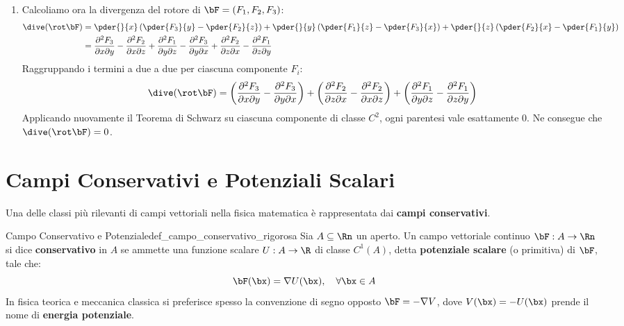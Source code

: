 \begin{dimostrazione}
\begin{enumerate}
    \item Calcoliamo ora la divergenza del rotore di $\bF = (F_1, F_2, F_3)$:
    \begin{align*}
    \dive(\rot \bF) &= \pder{}{x}\left( \pder{F_3}{y} - \pder{F_2}{z} \right) + \pder{}{y}\left( \pder{F_1}{z} - \pder{F_3}{x} \right) + \pder{}{z}\left( \pder{F_2}{x} - \pder{F_1}{y} \right) \\
    &= \frac{\partial^2 F_3}{\partial x \partial y} - \frac{\partial^2 F_2}{\partial x \partial z} + \frac{\partial^2 F_1}{\partial y \partial z} - \frac{\partial^2 F_3}{\partial y \partial x} + \frac{\partial^2 F_2}{\partial z \partial x} - \frac{\partial^2 F_1}{\partial z \partial y}
    \end{align*}
    Raggruppando i termini a due a due per ciascuna componente $F_i$:
    \[
    \dive(\rot \bF) = \left( \frac{\partial^2 F_3}{\partial x \partial y} - \frac{\partial^2 F_3}{\partial y \partial x} \right) + \left( \frac{\partial^2 F_2}{\partial z \partial x} - \frac{\partial^2 F_2}{\partial x \partial z} \right) + \left( \frac{\partial^2 F_1}{\partial y \partial z} - \frac{\partial^2 F_1}{\partial z \partial y} \right)
    \]
    Applicando nuovamente il Teorema di Schwarz su ciascuna componente di classe $C^2$, ogni parentesi vale esattamente $0$. Ne consegue che $\dive(\rot \bF) = 0$.
\end{enumerate}
\end{dimostrazione}

\section{Campi Conservativi e Potenziali Scalari}

Una delle classi più rilevanti di campi vettoriali nella fisica matematica è rappresentata dai \textbf{campi conservativi}.

\begin{definizione}{Campo Conservativo e Potenziale}{def_campo_conservativo_rigorosa}
Sia $A \subseteq \Rn$ un aperto. Un campo vettoriale continuo $\bF: A \to \Rn$ si dice \textbf{conservativo} in $A$ se ammette una funzione scalare $U: A \to \R$ di classe $C^1(A)$, detta \textbf{potenziale scalare} (o primitiva) di $\bF$, tale che:
\[
\bF(\bx) = \nabla U(\bx), \quad \forall \bx \in A
\]
In fisica teorica e meccanica classica si preferisce spesso la convenzione di segno opposto $\bF = -\nabla V$, dove $V(\bx) = -U(\bx)$ prende il nome di \textbf{energia potenziale}.
\end{definizione}


